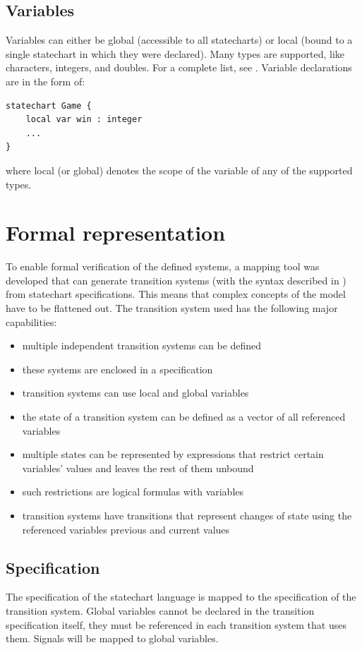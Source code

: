   \subsection{Variables}
Variables can either be global (accessible to all statecharts) or local (bound to a single statechart in which they were declared). Many types are supported, like characters, integers, and doubles. For a complete list, see \cite{fapts}. Variable declarations are in the form of:

\begin{lstlisting}
statechart Game {
	local var win : integer
	...
}
\end{lstlisting}

where local (or global) denotes the scope of the variable of any of the supported types.
\section{Formal representation}
To enable formal verification of the defined systems, a mapping tool was developed that can generate transition systems (with the syntax described in \cite{fapts}) from statechart specifications. This means that complex concepts of the model have to be flattened out. The transition system used has the following major capabilities:
\begin{itemize}
  \item multiple independent transition systems can be defined
  \item these systems are enclosed in a specification
  \item transition systems can use local and global variables
  \item the state of a transition system can be defined as a vector of all referenced variables
  \item multiple states can be represented by expressions that restrict certain variables' values and leaves the rest of them unbound
  \item such restrictions are logical formulas with variables
  \item transition systems have transitions that represent changes of state using the referenced variables previous and current values
\end{itemize}
  \subsection{Specification}
The specification of the statechart language is mapped to the specification of the transition system. Global variables cannot be declared in the transition specification itself, they must be referenced in each transition system that uses them. Signals will be mapped to global variables.
